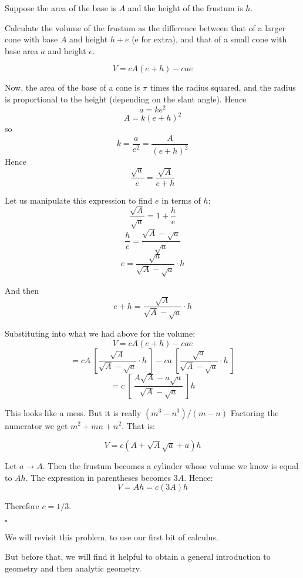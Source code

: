 \documentclass[11pt, oneside]{article}
\begin{document}
Suppose the area of the base is $A$ and the height of the frustum is $h$.  

Calculate the volume of the frustum as the difference between that of a larger cone with base $A$ and height $h + e$ (e for extra), and that of a small cone with base area $a$ and height $e$.

\[ V = cA(e + h) - cae \]

Now, the area of the base of a cone is $\pi$ times the radius squared, and the radius is proportional to the height (depending on the slant angle).  Hence
\[ a = ke^2 \]
\[ A = k(e + h)^2 \]
so
\[ k = \frac{a}{e^2} =\frac{A}{(e+h)^2} \]
Hence
\[ \frac{\sqrt{a}}{e} = \frac{\sqrt{A}}{e + h} \]

Let us manipulate this expression to find $e$ in terms of $h$:
\[ \frac{\sqrt{A}}{\sqrt{a}} = 1 + \frac{h}{e} \]
\[ \frac{h}{e} = \frac{\sqrt{A} - \sqrt{a}}{\sqrt{a}} \]
\[ e = \frac{\sqrt{a}}{\sqrt{A} - \sqrt{a}} \cdot h \]

And then
\[ e + h = \frac{\sqrt{A}}{\sqrt{A} - \sqrt{a}} \cdot h \]

Substituting into what we had above for the volume:
\[ V = cA(e+h) - cae \]
\[ = cA \ [ \frac{\sqrt{A}}{\sqrt{A} - \sqrt{a}} \cdot h \ ] - ca \ [ \frac{\sqrt{a}}{\sqrt{A} - \sqrt{a}}  \cdot h \ ] \]
\[ = c \ [ \   \frac{A \sqrt{A} - a \sqrt{a}}{\sqrt{A} - \sqrt{a}} \ ] h \]

This looks like a mess.  But it is really $(m^3 - n^3)/(m-n)$  Factoring the numerator we get $m^2 + mn + n^2$.  That is:

\[ V = c (A + \sqrt{A} \sqrt{a} + a) h \]

Let $a \rightarrow A$.  Then the frustum becomes a cylinder whose volume we know is equal to $Ah$.  The expression in parentheses becomes $3A$.  Hence:
\[ V = Ah = c(3A)h \]

Therefore $c = 1/3$.

$\square$

We will revisit this problem, to use our first bit of calculus.  

But before that, we will find it helpful to obtain a general introduction to geometry and then analytic geometry.
\end{document}

